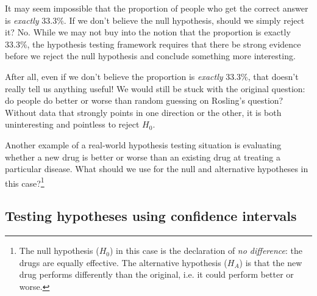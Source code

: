 \begin{example}{It may seem impossible that the
    proportion of people who get the correct answer
    is \emph{exactly} 33.3\%. If we don't believe the
    null hypothesis, should we simply reject it?}
  \label{fund_managers_sp500_not_reject_H0_interpretation}
  No. While we may not buy into the notion that
  the proportion is exactly 33.3\%, the hypothesis testing
  framework requires that there be strong evidence before
  we reject the null hypothesis and conclude something
  more interesting.

  After all, even if we don't believe the proportion is
  \emph{exactly} 33.3\%, that doesn't really tell us anything
  useful! We would still be stuck with the original question:
  do people do better or worse than random guessing on
  Rosling's question?
  Without data that strongly
  points in one direction or the other, it is both
  uninteresting and pointless to reject $H_0$.
\end{example}

\begin{exercise}
  Another example of a real-world hypothesis testing situation
  is evaluating whether a new drug is better or worse
  than an existing drug at treating a particular disease.
  What should we use for the null and alternative hypotheses in
  this case?\footnote{The null hypothesis ($H_0$) in this case
  is the declaration of \emph{no difference}: the drugs are equally
  effective. The alternative hypothesis ($H_A$) is that the
  new drug performs differently than the original,
  i.e. it could perform better or worse.}
\end{exercise}
  






\subsection{Testing hypotheses using confidence intervals}
\label{utilizingOurCI}


